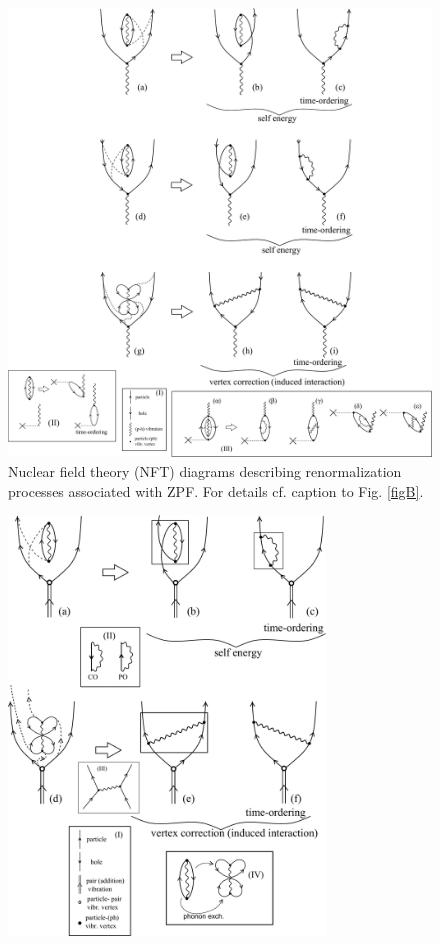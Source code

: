 \begin{subappendices}
\begin{figure}[h!]
\begin{center}
\includegraphics*[width=1.2\textwidth]{C7/figs_C7/figA}
\end{center}
\caption{Nuclear field theory (NFT) diagrams describing renormalization processes associated with ZPF. For details cf. caption to Fig. \ref{figB}.}\label{figA}
\end{figure}
 \begin{figure}[h!]
 	\begin{center}
\includegraphics*[width=0.75\textwidth]{C7/figs_C7/figB}

\end{center}
\end{figure}
\end{subappendices}
